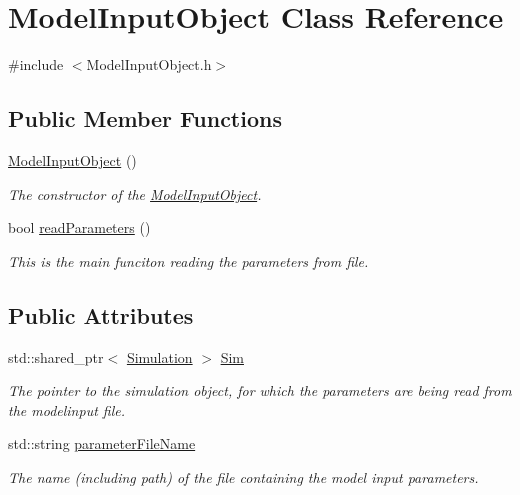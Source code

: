 \hypertarget{classModelInputObject}{}\section{Model\+Input\+Object Class Reference}
\label{classModelInputObject}


{\ttfamily \#include $<$Model\+Input\+Object.\+h$>$}

\subsection*{Public Member Functions}
\begin{DoxyCompactItemize}
\item 
\hypertarget{classModelInputObject_a64b031469546b19177c0a13365058162}{}\hyperlink{classModelInputObject_a64b031469546b19177c0a13365058162}{Model\+Input\+Object} ()\label{classModelInputObject_a64b031469546b19177c0a13365058162}

\begin{DoxyCompactList}\small\item\em The constructor of the \hyperlink{classModelInputObject}{Model\+Input\+Object}. \end{DoxyCompactList}\item 
bool \hyperlink{classModelInputObject_a9741685527f446bd2bf66455c5b01d0c}{read\+Parameters} ()
\begin{DoxyCompactList}\small\item\em This is the main funciton reading the parameters from file. \end{DoxyCompactList}\end{DoxyCompactItemize}
\subsection*{Public Attributes}
\begin{DoxyCompactItemize}
\item 
\hypertarget{classModelInputObject_a449b2f014b6095bf2a76adb5dfb9dc50}{}std\+::shared\+\_\+ptr$<$ \hyperlink{classSimulation}{Simulation} $>$ \hyperlink{classModelInputObject_a449b2f014b6095bf2a76adb5dfb9dc50}{Sim}\label{classModelInputObject_a449b2f014b6095bf2a76adb5dfb9dc50}

\begin{DoxyCompactList}\small\item\em The pointer to the simulation object, for which the parameters are being read from the modelinput file. \end{DoxyCompactList}\item 
\hypertarget{classModelInputObject_a949d172401012173bcb6a5683f5690df}{}std\+::string \hyperlink{classModelInputObject_a949d172401012173bcb6a5683f5690df}{parameter\+File\+Name}\label{classModelInputObject_a949d172401012173bcb6a5683f5690df}

\begin{DoxyCompactList}\small\item\em The name (including path) of the file containing the model input parameters. \end{DoxyCompactList}\end{DoxyCompactItemize}


